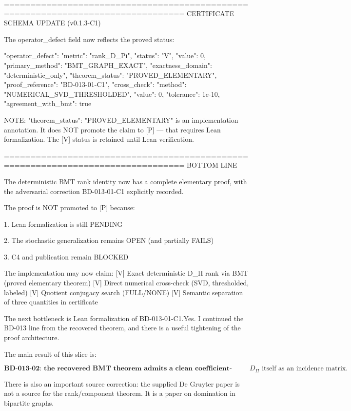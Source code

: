 ================================================================================
CERTIFICATE SCHEMA UPDATE (v0.1.3-C1)

The operator_defect field now reflects the proved status:

{
"operator_defect": {
"metric": "rank_D_Pi",
"status": "V",
"value": 0,
"primary_method": "BMT_GRAPH_EXACT",
"exactness_domain": "deterministic_only",
"theorem_status": "PROVED_ELEMENTARY",
"proof_reference": "BD-013-01-C1",
"cross_check": {
"method": "NUMERICAL_SVD_THRESHOLDED",
"value": 0,
"tolerance": 1e-10,
"agreement_with_bmt": true
}
}
}

NOTE: "theorem_status": "PROVED_ELEMENTARY" is an implementation annotation.
It does NOT promote the claim to [P] — that requires Lean formalization.
The [V] status is retained until Lean verification.

================================================================================
BOTTOM LINE

The deterministic BMT rank identity now has a complete elementary proof,
with the adversarial correction BD-013-01-C1 explicitly recorded.

The proof is NOT promoted to [P] because:

1. Lean formalization is still PENDING


2. The stochastic generalization remains OPEN (and partially FAILS)


3. C4 and publication remain BLOCKED



The implementation may now claim:
[V] Exact deterministic D_Π rank via BMT (proved elementary theorem)
[V] Direct numerical cross-check (SVD, thresholded, labeled)
[V] Quotient conjugacy search (FULL/NONE)
[V] Semantic separation of three quantities in certificate

The next bottleneck is Lean formalization of BD-013-01-C1.Yes. I continued the BD-013 line from the recovered theorem, and there is a useful tightening of the proof architecture.

The main result of this slice is:

\[
\boxed{\textbf{BD-013-02: the recovered BMT theorem admits a clean coefficient-space proof with no need to identify }D_\Pi\text{ itself as an incidence matrix.}}
\]

There is also an important source correction: the supplied De Gruyter paper is not a source for the rank/component theorem. It is a paper on domination in bipartite graphs. 

